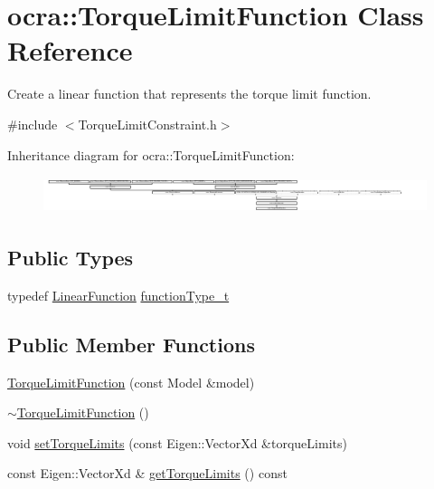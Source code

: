 \hypertarget{classocra_1_1TorqueLimitFunction}{}\section{ocra\+:\+:Torque\+Limit\+Function Class Reference}
\label{classocra_1_1TorqueLimitFunction}


Create a linear function that represents the torque limit function.  




{\ttfamily \#include $<$Torque\+Limit\+Constraint.\+h$>$}

Inheritance diagram for ocra\+:\+:Torque\+Limit\+Function\+:\begin{figure}[H]
\begin{center}
\leavevmode
\includegraphics[height=1.082126cm]{dd/d3d/classocra_1_1TorqueLimitFunction}
\end{center}
\end{figure}
\subsection*{Public Types}
\begin{DoxyCompactItemize}
\item 
typedef \hyperlink{classocra_1_1LinearFunction}{Linear\+Function} \hyperlink{classocra_1_1TorqueLimitFunction_a0c9d97d4e11ee173ae359698d6c95b25}{function\+Type\+\_\+t}
\end{DoxyCompactItemize}
\subsection*{Public Member Functions}
\begin{DoxyCompactItemize}
\item 
\hyperlink{classocra_1_1TorqueLimitFunction_a3ca04338256c4a0bf484f29dc7aeb06d}{Torque\+Limit\+Function} (const Model \&model)
\item 
\hyperlink{classocra_1_1TorqueLimitFunction_a810eb8dd094bb809859a6adf9c6c4a18}{$\sim$\+Torque\+Limit\+Function} ()
\item 
void \hyperlink{classocra_1_1TorqueLimitFunction_a038250b745913584724401ea719177a5}{set\+Torque\+Limits} (const Eigen\+::\+Vector\+Xd \&torque\+Limits)
\item 
const Eigen\+::\+Vector\+Xd \& \hyperlink{classocra_1_1TorqueLimitFunction_a455115a2dc26da5603bbf843bb88ef38}{get\+Torque\+Limits} () const
\end{DoxyCompactItemize}
